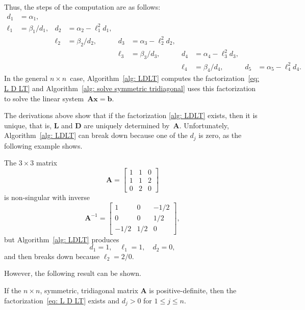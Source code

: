 Thus, the steps of the computation are as follows:
\begin{align*}
         d_1&=\alpha_1,   &   &                      &&&&&&\\
      \ell_1&=\beta_1/d_1,&d_2&=\alpha_2-\ell_1^2d_1,&&&&&&\\
    &&\ell_2&=\beta_2/d_2,&d_3&=\alpha_3-\ell_2^2d_2,&&&&\\
  &&&&\ell_3&=\beta_3/d_3,&d_4&=\alpha_4-\ell_3^2d_3,&&\\
&&&&&&\ell_4&=\beta_4/d_4,&d_5&=\alpha_5-\ell_4^2d_4.
\end{align*}
In the general $n\times n$~case,
Algorithm~\ref{alg: LDLT} computes the factorization~\eqref{eq: L D LT}
and Algorithm~\ref{alg: solve symmetric tridiagonal} 
uses this factorization to solve the linear 
system~$\boldsymbol{A}\boldsymbol{x}=\boldsymbol{b}$. 

The derivations above show that if the factorization \eqref{alg: LDLT} exists,
then it is unique, that is, $\boldsymbol{L}$ and $\boldsymbol{D}$ are uniquely 
determined by~$\boldsymbol{A}$.  Unfortunately,
Algorithm~\ref{alg: LDLT} can break down because one of the $d_j$ is zero, as 
the following example shows.

\begin{example}
The $3\times3$ matrix
\[
\boldsymbol{A}=\begin{bmatrix}1&1&0\\1&1&2\\ 0&2&0 \end{bmatrix}
\]
is non-singular with inverse
\[
\boldsymbol{A}^{-1}=\begin{bmatrix}1&0&-1/2\\ 0&0&1/2\\ -1/2&1/2&0\end{bmatrix},
\]
but Algorithm~\ref{alg: LDLT} produces
\[
d_1=1,\quad \ell_1=1,\quad d_2=0,
\]
and then breaks down because $\ell_2=2/0$.
\end{example}

However, the following result can be shown.

\begin{theorem}
If the $n\times n$, symmetric, tridiagonal matrix $\boldsymbol{A}$ is 
positive-definite, then the factorization~\eqref{eq: L D LT} exists and $d_j>0$ 
for $1\le j\le n$.
\end{theorem}

